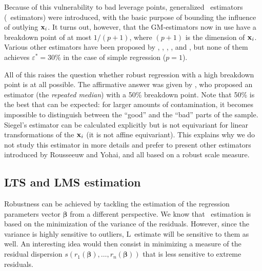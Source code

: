 Because of this vulnerability to bad leverage points, generalized 
~estimators (~estimators) were introduced, with the basic purpose of
bounding the influence of outlying $\mathbf x_i$. It turns out, however, that
the GM-estimators now in use have a breakdown point of at most $1/(p+1)$, where
$(p+1)$ is the dimension of $\mathbf x_i$. Various other estimators have been
proposed by \citet{Theil:1950}, \citet{Brown:1951}, \citet{Sen:1968},
\citet{Jaeckel:1972}, and \citet{Andrews:1974}, but none of them achieves
$\varepsilon^*=30\%$ in the case of simple regression ($p=1$).

All of this raises the question whether robust regression with a high breakdown
point is at all possible. The affirmative answer was given by
\citet{Siegel:1982}, who proposed an estimator (the \emph{repeated median})
with a 50\% breakdown point. Note that 50\% is the best that can be expected:
for larger amounts of contamination, it becomes impossible to distinguish
between the “good” and the “bad” parts of the sample. Siegel's estimator can be
calculated explicitly but is not equivariant for linear transformations of the
$\mathbf x_i$ (it is not affine equivariant). This explains why we do not
study this estimator in more details and prefer to present other estimators
introduced by Rousseeuw and Yohai, and all based on a robust scale measure.

\subsection{LTS and LMS estimation}

Robustness can be achieved by tackling the estimation of the regression
parameters vector $\boldsymbol\beta$ from a different perspective. We know that
~estimation is based on the minimization of the variance of the
residuals. However, since the variance is highly sensitive to outliers,
L~estimate will be sensitive to them as well. An interesting idea would then
consist in minimizing a measure of the residual dispersion
$s(r_1(\boldsymbol\beta), \dots, r_n(\boldsymbol\beta))$ that is less
sensitive to extreme residuals.

